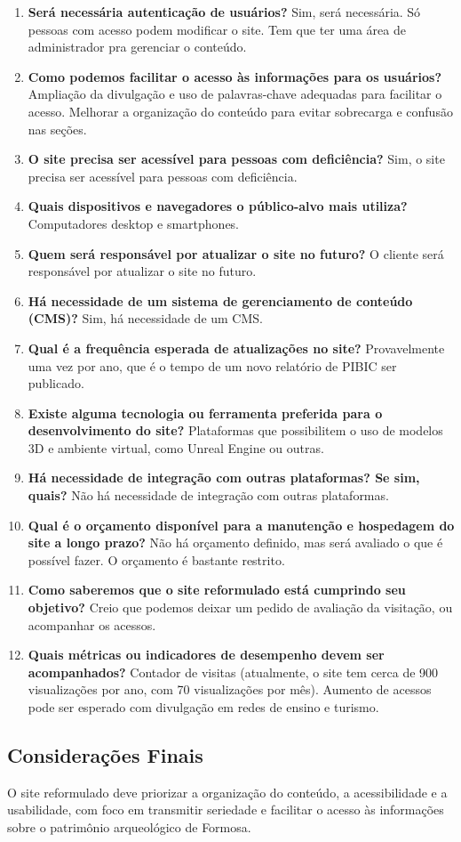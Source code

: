 \begin{enumerate}
    \item \textbf{Será necessária autenticação de usuários?}  
    Sim, será necessária. Só pessoas com acesso podem modificar o site. Tem que ter uma área de administrador pra gerenciar o conteúdo.

    \item \textbf{Como podemos facilitar o acesso às informações para os usuários?}  
    Ampliação da divulgação e uso de palavras-chave adequadas para facilitar o acesso.  
    Melhorar a organização do conteúdo para evitar sobrecarga e confusão nas seções.

    \item \textbf{O site precisa ser acessível para pessoas com deficiência?}  
    Sim, o site precisa ser acessível para pessoas com deficiência.

    \item \textbf{Quais dispositivos e navegadores o público-alvo mais utiliza?}  
    Computadores desktop e smartphones.

    \item \textbf{Quem será responsável por atualizar o site no futuro?}  
    O cliente será responsável por atualizar o site no futuro.

    \item \textbf{Há necessidade de um sistema de gerenciamento de conteúdo (CMS)?}  
    Sim, há necessidade de um CMS.

    \item \textbf{Qual é a frequência esperada de atualizações no site?}  
    Provavelmente uma vez por ano, que é o tempo de um novo relatório de PIBIC ser publicado.

    \item \textbf{Existe alguma tecnologia ou ferramenta preferida para o desenvolvimento do site?}  
    Plataformas que possibilitem o uso de modelos 3D e ambiente virtual, como Unreal Engine ou outras.

    \item \textbf{Há necessidade de integração com outras plataformas? Se sim, quais?}  
    Não há necessidade de integração com outras plataformas.

    \item \textbf{Qual é o orçamento disponível para a manutenção e hospedagem do site a longo prazo?}  
    Não há orçamento definido, mas será avaliado o que é possível fazer. O orçamento é bastante restrito.

    \item \textbf{Como saberemos que o site reformulado está cumprindo seu objetivo?}  
    Creio que podemos deixar um pedido de avaliação da visitação, ou acompanhar os acessos.

    \item \textbf{Quais métricas ou indicadores de desempenho devem ser acompanhados?}  
    Contador de visitas (atualmente, o site tem cerca de 900 visualizações por ano, com 70 visualizações por mês).  
    Aumento de acessos pode ser esperado com divulgação em redes de ensino e turismo.
\end{enumerate}

\subsection{Considerações Finais}  
O site reformulado deve priorizar a organização do conteúdo, a acessibilidade e a usabilidade, com foco em transmitir seriedade e facilitar o acesso às informações sobre o patrimônio arqueológico de Formosa. 